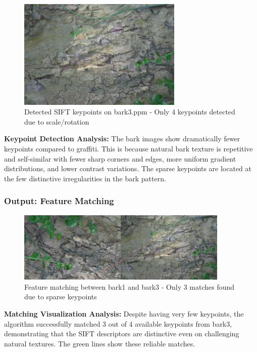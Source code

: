 \documentclass[12pt,a4paper]{article}
\begin{document}
\begin{figure}[H]
\centering
\includegraphics[width=0.7\textwidth]{report/figures/bark3_keypoints.jpg}
\caption{Detected SIFT keypoints on bark3.ppm - Only 4 keypoints detected due to scale/rotation}
\label{fig:bark3_keypoints}
\end{figure}

\textbf{Keypoint Detection Analysis:}
The bark images show dramatically fewer keypoints compared to graffiti. This is because natural bark texture is repetitive and self-similar with fewer sharp corners and edges, more uniform gradient distributions, and lower contrast variations. The sparse keypoints are located at the few distinctive irregularities in the bark pattern.

\subsubsection{Output: Feature Matching}

\begin{figure}[H]
\centering
\includegraphics[width=0.9\textwidth]{report/figures/bark_matches.jpg}
\caption{Feature matching between bark1 and bark3 - Only 3 matches found due to sparse keypoints}
\label{fig:bark_matches}
\end{figure}

\textbf{Matching Visualization Analysis:}
Despite having very few keypoints, the algorithm successfully matched 3 out of 4 available keypoints from bark3, demonstrating that the SIFT descriptors are distinctive even on challenging natural textures. The green lines show these reliable matches.
\end{document}
